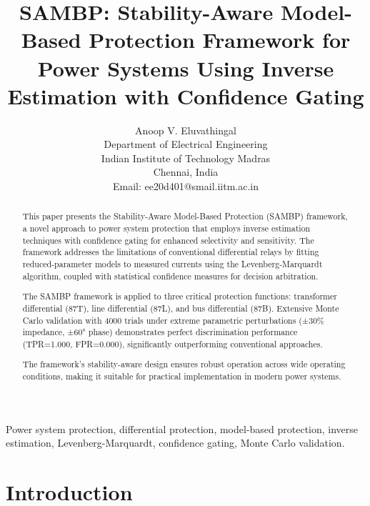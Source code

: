 \documentclass[10pt]{article}
\begin{document}
\title{SAMBP: Stability-Aware Model-Based Protection Framework for Power Systems Using Inverse Estimation with Confidence Gating}

\author{Anoop V. Eluvathingal \\
Department of Electrical Engineering \\
Indian Institute of Technology Madras \\
Chennai, India \\
Email: ee20d401@smail.iitm.ac.in}

\maketitle

\begin{abstract}
This paper presents the Stability-Aware Model-Based Protection (SAMBP) framework, a novel approach to power system protection that employs inverse estimation techniques with confidence gating for enhanced selectivity and sensitivity. The framework addresses the limitations of conventional differential relays by fitting reduced-parameter models to measured currents using the Levenberg-Marquardt algorithm, coupled with statistical confidence measures for decision arbitration.

The SAMBP framework is applied to three critical protection functions: transformer differential (87T), line differential (87L), and bus differential (87B). Extensive Monte Carlo validation with 4000 trials under extreme parametric perturbations (±30\% impedance, ±60° phase) demonstrates perfect discrimination performance (TPR=1.000, FPR=0.000), significantly outperforming conventional approaches.

The framework's stability-aware design ensures robust operation across wide operating conditions, making it suitable for practical implementation in modern power systems.
\end{abstract}

\begin{IEEEkeywords}
Power system protection, differential protection, model-based protection, inverse estimation, Levenberg-Marquardt, confidence gating, Monte Carlo validation.
\end{IEEEkeywords}

\section{Introduction}
\label{sec:introduction}
\end{document}

